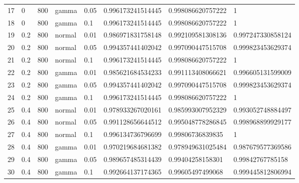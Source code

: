 \begin{table}[ht]
\begin{tabular}{rlllllll}
  17 & 0 & 800 & gamma & 0.05 & 0.996173241514445 & 0.998086620757222 & 1 \\ 
  18 & 0 & 800 & gamma & 0.1 & 0.996173241514445 & 0.998086620757222 & 1 \\ 
  19 & 0.2 & 800 & normal & 0.01 & 0.986971831758148 & 0.992109581308136 & 0.997247330858124 \\ 
  20 & 0.2 & 800 & normal & 0.05 & 0.994357441402042 & 0.997090447515708 & 0.999823453629374 \\ 
  21 & 0.2 & 800 & normal & 0.1 & 0.996173241514445 & 0.998086620757222 & 1 \\ 
  22 & 0.2 & 800 & gamma & 0.01 & 0.985621684534233 & 0.991113408066621 & 0.996605131599009 \\ 
  23 & 0.2 & 800 & gamma & 0.05 & 0.994357441402042 & 0.997090447515708 & 0.999823453629374 \\ 
  24 & 0.2 & 800 & gamma & 0.1 & 0.996173241514445 & 0.998086620757222 & 1 \\ 
  25 & 0.4 & 800 & normal & 0.01 & 0.978933267020161 & 0.985993007952329 & 0.993052748884497 \\ 
  26 & 0.4 & 800 & normal & 0.05 & 0.991128656644512 & 0.995048778286845 & 0.998968899929177 \\ 
  27 & 0.4 & 800 & normal & 0.1 & 0.996134736796699 & 0.99806736839835 & 1 \\ 
  28 & 0.4 & 800 & gamma & 0.01 & 0.970219684681382 & 0.978949631025484 & 0.987679577369586 \\ 
  29 & 0.4 & 800 & gamma & 0.05 & 0.989657485314439 & 0.99404258158301 & 0.99842767785158 \\ 
  30 & 0.4 & 800 & gamma & 0.1 & 0.992664137174365 & 0.99605497499068 & 0.999445812806994 \\ 
   \hline
\end{tabular}
\end{table}

